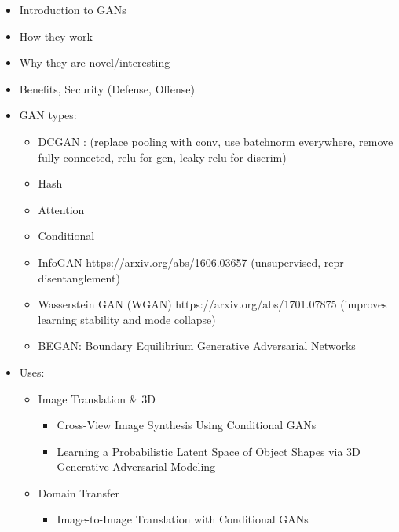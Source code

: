 \documentclass[11pt]{article}
\begin{document}
\begin{itemize}
    \item Introduction to GANs \cite{NIPS2014_5423} \\ %
    \item How they work\\
    \item Why they are novel/interesting\\
    \item Benefits, Security (Defense, Offense)\\

    \item GAN types: %
    \begin{itemize}
        \item DCGAN \cite{DBLP:journals/corr/RadfordMC15}: (replace pooling with conv, use batchnorm everywhere, remove fully connected, relu for gen, leaky relu for discrim) %
        \item Hash
        \item Attention
        \item Conditional \cite{mirza2014conditional}\\
        \item InfoGAN https://arxiv.org/abs/1606.03657 (unsupervised, repr disentanglement)
        \item Wasserstein GAN (WGAN) https://arxiv.org/abs/1701.07875 (improves learning stability and mode collapse)
        \item BEGAN: Boundary Equilibrium Generative Adversarial Networks
    \end{itemize}

    \item Uses: 
    \begin{itemize}
        \item Image Translation \& 3D
        \begin{itemize}
            \item Cross-View Image Synthesis Using Conditional GANs \cite{regmi2018crossview}
            \item Learning a Probabilistic Latent Space of Object Shapes via 3D Generative-Adversarial Modeling \cite{NIPS2016_6096}
        \end{itemize}
        
        \item Domain Transfer
        \begin{itemize}
            \item Image-to-Image Translation with Conditional GANs \cite{isola2017image}
        \end{itemize}
        

\end{itemize}
\end{itemize}
\end{document}
